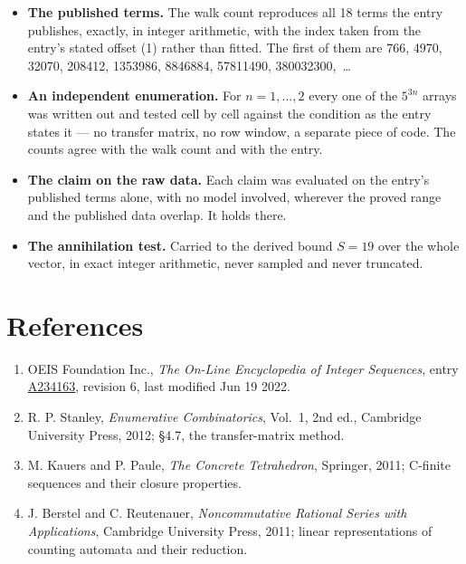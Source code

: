 \documentclass[11pt]{article}
\theoremstyle{definition}
\begin{document}
\begin{itemize}

\item {\bfseries The published terms.} The walk count reproduces all 18 terms the entry publishes, exactly, in integer arithmetic, with the index taken from the entry's stated offset (1) rather than fitted. The first of them are 766, 4970, 32070, 208412, 1353986, 8846884, 57811490, 380032300,~\dots

\item {\bfseries An independent enumeration.} For $n = 1,\dots,2$ every one of the $5^{3n}$ arrays was written out and tested cell by cell against the condition as the entry states it --- no transfer matrix, no row window, a separate piece of code. The counts agree with the walk count and with the entry.

\item {\bfseries The claim on the raw data.} Each claim was evaluated on the entry's published terms alone, with no model involved, wherever the proved range and the published data overlap. It holds there.

\item {\bfseries The annihilation test.} Carried to the derived bound $S = 19$ over the whole vector, in exact integer arithmetic, never sampled and never truncated.

\end{itemize}

\section{References}

\begin{enumerate}

\item OEIS Foundation Inc., \emph{The On-Line Encyclopedia of Integer Sequences}, entry \href{https://oeis.org/A234163}{A234163}, revision 6, last modified Jun 19 2022.

\item R. P. Stanley, \emph{Enumerative Combinatorics}, Vol.~1, 2nd ed., Cambridge University Press, 2012; \S4.7, the transfer-matrix method.

\item M. Kauers and P. Paule, \emph{The Concrete Tetrahedron}, Springer, 2011; C-finite sequences and their closure properties.

\item J. Berstel and C. Reutenauer, \emph{Noncommutative Rational Series with Applications}, Cambridge University Press, 2011; linear representations of counting automata and their reduction.

\end{enumerate}
\end{document}
